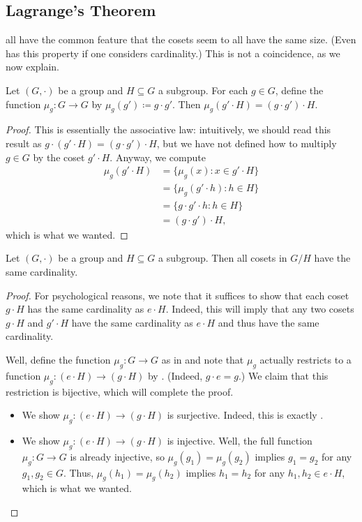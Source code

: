 \documentclass[../main.tex]{subfiles}
\begin{document}
\subsection{Lagrange's Theorem}
 all have the common feature that the cosets seem to all have the same size. (Even  has this property if one considers cardinality.) This is not a coincidence, as we now explain.
\begin{lemma} \label{lem:mu-g-moves-cosets}
    Let $(G,\cdot)$ be a group and $H\subseteq G$ a subgroup. For each $g\in G$, define the function $\mu_g\colon G\to G$ by $\mu_g(g')\coloneqq g\cdot g'$. Then $\mu_g(g'\cdot H)=(g\cdot g')\cdot H$.
\end{lemma}
\begin{proof}
    This is essentially the associative law: intuitively, we should read this result as $g\cdot(g'\cdot H)=(g\cdot g')\cdot H$, but we have not defined how to multiply $g\in G$ by the coset $g'\cdot H$. Anyway, we compute
    \begin{align*}
        \mu_g(g'\cdot H) &= \{\mu_g(x):x\in g'\cdot H\} \\
        &= \{\mu_g(g'\cdot h):h\in H\} \\
        &= \{g\cdot g'\cdot h:h\in H\} \\
        &= (g\cdot g')\cdot H,
    \end{align*}
    which is what we wanted.
\end{proof}
\begin{theorem}[Lagrange] \label{thm:lagrange}
    Let $(G,\cdot)$ be a group and $H\subseteq G$ a subgroup. Then all cosets in $G/H$ have the same cardinality.
\end{theorem}
\begin{proof}
    For psychological reasons, we note that it suffices to show that each coset $g\cdot H$ has the same cardinality as $e\cdot H$. Indeed, this will imply that any two cosets $g\cdot H$ and $g'\cdot H$ have the same cardinality as $e\cdot H$ and thus have the same cardinality.
    
    Well, define the function $\mu_g\colon G\to G$ as in  and note that $\mu_g$ actually restricts to a function $\mu_g\colon(e\cdot H)\to(g\cdot H)$ by . (Indeed, $g\cdot e=g$.) We claim that this restriction is bijective, which will complete the proof.
    \begin{itemize}
        \item We show $\mu_g\colon(e\cdot H)\to(g\cdot H)$ is surjective. Indeed, this is exactly .
        \item We show $\mu_g\colon(e\cdot H)\to(g\cdot H)$ is injective. Well, the full function $\mu_g\colon G\to G$ is already injective, so $\mu_g(g_1)=\mu_g(g_2)$ implies $g_1=g_2$ for any $g_1,g_2\in G$. Thus, $\mu_g(h_1)=\mu_g(h_2)$ implies $h_1=h_2$ for any $h_1,h_2\in e\cdot H$, which is what we wanted.
        \qedhere
    \end{itemize}
\end{proof}
\end{document}
